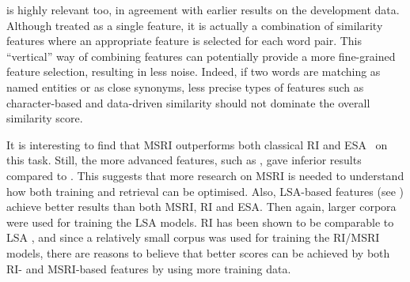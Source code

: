  is highly relevant too, in agreement with earlier results on the development data. Although treated as a single feature, it is actually a combination of similarity features where an appropriate feature is selected for each word pair. This ``vertical'' way of combining features can potentially provide a more fine-grained feature selection, resulting in less noise. Indeed, if two words are matching as named entities or as close synonyms, less precise types of features such as character-based and data-driven similarity should  not dominate the overall similarity score. 

It is interesting to find that MSRI outperforms both classical RI and ESA~\citep{Gabrilovich2007} on this task.
Still, the more advanced features, such as , gave inferior results compared to . This suggests that more research on MSRI is needed to understand how both training and retrieval can be optimised.
Also, LSA-based features (see ) achieve better results than both MSRI, RI and ESA.
Then again, larger corpora were used for training the LSA models.
RI has been shown to be comparable to LSA 
\citep{Karlgren2001}, and since a relatively small corpus was used for training the RI/MSRI models, there are reasons to believe that better scores can be achieved by both RI- and MSRI-based features by using more training data.

